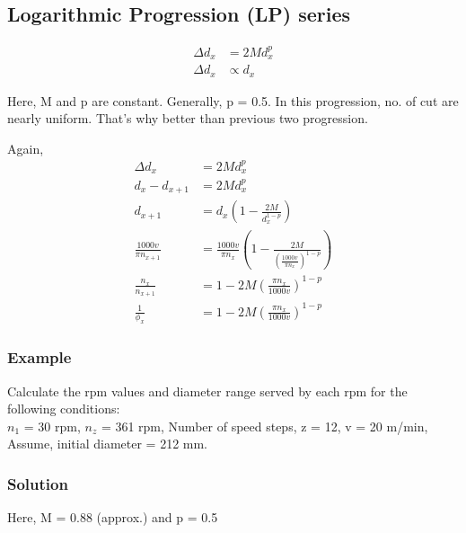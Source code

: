 \documentclass{article}
\begin{document}
\subsection*{Logarithmic Progression (LP) series}
\begin{align*}
  \Delta d_x &= 2 Md_x^p \\
  \Delta d_x &\propto d_x 
\end{align*}

Here, M and p are constant. Generally, p = 0.5. In this progression, no. of cut are nearly uniform. That's why better than previous two progression. 

Again, 
\begin{align*}
  \Delta d_x &= 2 Md_x^p \\
  d_x - d_{x+1} &= 2Md_x^p \\
  d_{x+1} &= d_x \left(1 - \frac{2M}{d_x^{1-p}}\right) \\
  \frac{1000 v}{\pi n_{x+1}} &= \frac{1000 v}{\pi n_{x}} \left(1 - \frac{2M}{\left(\frac{1000 v}{\pi n_{x}}\right)^{1-p}}\right) \\ 
  \frac{n_x}{n_{x+1}} &= 1 - 2M  \left(\frac{\pi n_{x}}{1000 v}\right)^{1-p}\\
  \frac{1}{\phi_x} &= 1 - 2M  \left(\frac{\pi n_{x}}{1000 v}\right)^{1-p}
\end{align*}

\subsubsection*{Example}
Calculate the rpm values and diameter range served by each rpm for
the following conditions:\\
$n_1$ = 30 rpm,
$n_z$ = 361 rpm,
Number of speed steps, z = 12,
v = 20 m/min, Assume, initial diameter = 212 mm.

\subsubsection*{Solution}
Here, M = 0.88 (approx.)  and p = 0.5 
\end{document}
